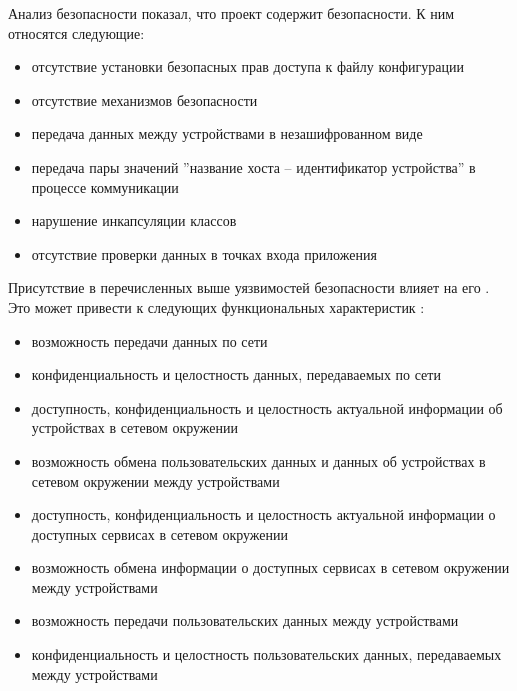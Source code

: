 %
Анализ безопасности  показал, что проект содержит  безопасности. 
%
К ним относятся следующие:
\begin{itemize}
	\setlength{\itemsep}{0pt}%

	\item отсутствие установки безопасных прав доступа к файлу конфигурации
	\item отсутствие механизмов безопасности
	\item передача данных между устройствами в незашифрованном виде
	\item передача пары значений ''название хоста -- идентификатор устройства'' в процессе коммуникации
	\item нарушение инкапсуляции классов  
	\item отсутствие проверки данных в точках входа приложения
\end{itemize}

%
Присутствие в  перечисленных выше уязвимостей безопасности влияет на его . 
%
Это может привести к  следующих функциональных характеристик :
\begin{itemize}
	\setlength{\itemsep}{0pt}%

	\item возможность передачи данных по сети
	\item конфиденциальность и целостность данных, передаваемых по сети

	\item доступность, конфиденциальность и целостность актуальной информации об устройствах в сетевом окружении
	\item возможность обмена пользовательских данных и данных об устройствах в сетевом окружении между устройствами

	\item доступность, конфиденциальность и целостность актуальной информации о доступных сервисах в сетевом окружении
	\item возможность обмена информации о доступных сервисах в сетевом окружении между устройствами

	\item возможность передачи пользовательских данных между устройствами
	\item конфиденциальность и целостность пользовательских данных, передаваемых между устройствами
\end{itemize}

